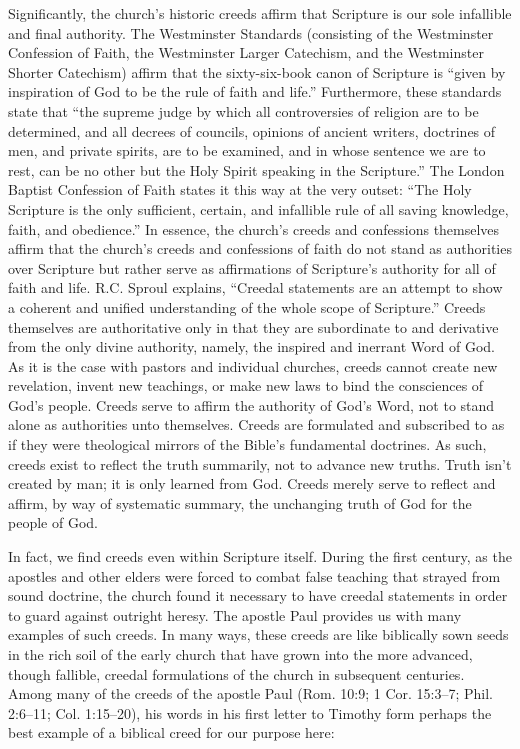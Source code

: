 Significantly, the church’s historic creeds affirm that Scripture is our sole infallible and final authority. The Westminster Standards (consisting of the Westminster Confession of Faith, the Westminster Larger Catechism, and the Westminster Shorter Catechism) affirm that the sixty-six-book canon of Scripture is “given by inspiration of God to be the rule of faith and life.” Furthermore, these standards state that “the supreme judge by which all controversies of religion are to be determined, and all decrees of councils, opinions of ancient writers, doctrines of men, and private spirits, are to be examined, and in whose sentence we are to rest, can be no other but the Holy Spirit speaking in the Scripture.” The London Baptist Confession of Faith states it this way at the very outset: “The Holy Scripture is the only sufficient, certain, and infallible rule of all saving knowledge, faith, and obedience.” In essence, the church’s creeds and confessions themselves affirm that the church’s creeds and confessions of faith do not stand as authorities over Scripture but rather serve as affirmations of Scripture’s authority for all of faith and life. R.C. Sproul explains, “Creedal statements are an attempt to show a coherent and unified understanding of the whole scope of Scripture.” Creeds themselves are authoritative only in that they are subordinate to and derivative from the only divine authority, namely, the inspired and inerrant Word of God. As it is the case with pastors and individual churches, creeds cannot create new revelation, invent new teachings, or make new laws to bind the consciences of God’s people. Creeds serve to affirm the authority of God’s Word, not to stand alone as authorities unto themselves. Creeds are formulated and subscribed to as if they were theological mirrors of the Bible’s fundamental doctrines. As such, creeds exist to reflect the truth summarily, not to advance new truths. Truth isn’t created by man; it is only learned from God. Creeds merely serve to reflect and affirm, by way of systematic summary, the unchanging truth of God for the people of God.

\medskip

In fact, we find creeds even within Scripture itself. During the first century, as the apostles and other elders were forced to combat false teaching that strayed from sound doctrine, the church found it necessary to have creedal statements in order to guard against outright heresy. The apostle Paul provides us with many examples of such creeds. In many ways, these creeds are like biblically sown seeds in the rich soil of the early church that have grown into the more advanced, though fallible, creedal formulations of the church in subsequent centuries. Among many of the creeds of the apostle Paul (Rom. 10:9; 1 Cor. 15:3–7; Phil. 2:6–11; Col. 1:15–20), his words in his first letter to Timothy form perhaps the best example of a biblical creed for our purpose here:

